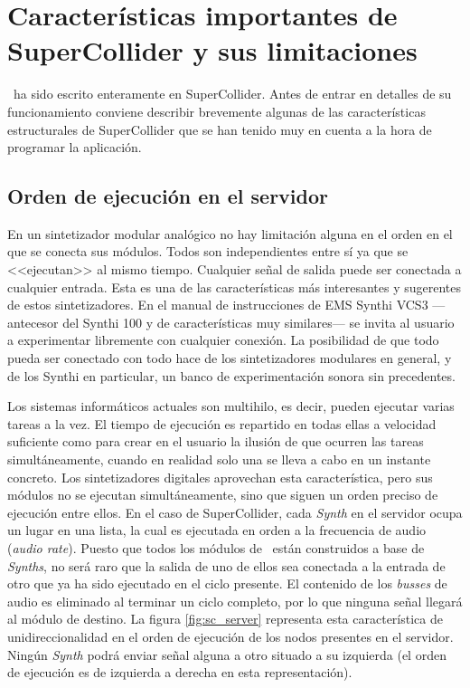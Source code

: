 \section[Características de SuperCollider]{Características importantes de SuperCollider y sus limitaciones}
\label{sec:sc_features}

\appName~ha sido escrito enteramente en SuperCollider. Antes de entrar en detalles de su funcionamiento conviene describir brevemente algunas de las características estructurales de SuperCollider que se han tenido muy en cuenta a la hora de programar la aplicación.

\subsection{Orden de ejecución en el servidor}
En un sintetizador modular analógico no hay limitación alguna en el orden en el que se conecta sus módulos. Todos son independientes entre sí ya que se <<ejecutan>> al mismo tiempo. Cualquier señal de salida puede ser conectada a cualquier entrada. Esta es una de las características más interesantes y sugerentes de estos sintetizadores. En el manual de instrucciones de EMS Synthi VCS3 \cite{SynthiVCS3_brochure}  ---antecesor del Synthi 100 y de características muy similares--- se invita al usuario a experimentar libremente con cualquier conexión. La posibilidad de que todo pueda ser conectado con todo hace de los sintetizadores modulares en general, y de los Synthi en particular, un banco de experimentación sonora sin precedentes.

Los sistemas informáticos actuales son multihilo, es decir, pueden ejecutar varias tareas a la vez. El tiempo de ejecución es repartido en todas ellas a velocidad suficiente como para crear en el usuario la ilusión de que ocurren las tareas simultáneamente, cuando en realidad solo una se lleva a cabo en un instante concreto. Los sintetizadores digitales aprovechan esta característica, pero sus módulos no se ejecutan simultáneamente, sino que siguen un orden preciso de ejecución entre ellos. En el caso de SuperCollider, cada \textit{Synth} en el servidor ocupa un lugar en una lista, la cual es ejecutada en orden a la frecuencia de audio (\textit{audio rate}). Puesto que todos los módulos de \appName~están construidos a base de \textit{Synths}, no será raro que la salida de uno de ellos sea conectada a la entrada de otro que ya ha sido ejecutado en el ciclo presente. El contenido de los \textit{busses} de audio es eliminado al terminar un ciclo completo, por lo que ninguna señal llegará al módulo de destino. La figura \ref{fig:sc_server} representa esta característica de unidireccionalidad en el orden de ejecución de los nodos presentes en el servidor. Ningún \textit{Synth} podrá enviar señal alguna a otro situado a su izquierda (el orden de ejecución es de izquierda a derecha en esta representación).

